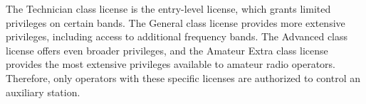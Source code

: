 The Technician class license is the entry-level license, which grants limited privileges on certain bands. The General class license provides more extensive privileges, including access to additional frequency bands. The Advanced class license offers even broader privileges, and the Amateur Extra class license provides the most extensive privileges available to amateur radio operators. Therefore, only operators with these specific licenses are authorized to control an auxiliary station.

